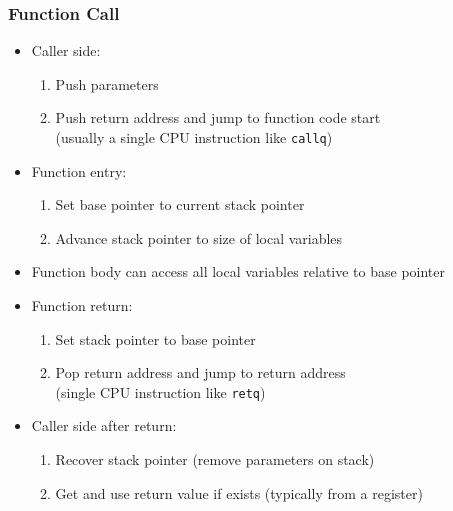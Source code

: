 \begin{frame}
\frametitle{Function Call}
\begin{itemize}
\item Caller side:
	\begin{enumerate}
	\item Push parameters
	\item Push return address and jump to function code start\\
		(usually a single CPU instruction like \lstinline!callq!)
	\end{enumerate}
\item Function entry:
	\begin{enumerate}
	\item Set base pointer to current stack pointer
	\item Advance stack pointer to size of local variables
	\end{enumerate}
\item Function body can access all local variables relative to base pointer\
\item Function return:
	\begin{enumerate}
	\item Set stack pointer to base pointer
	\item Pop return address and jump to return address\\
		(single CPU instruction like \lstinline!retq!)
	\end{enumerate}
\item Caller side after return:
	\begin{enumerate}
	\item Recover stack pointer (remove parameters on stack)
	\item Get and use return value if exists (typically from a register)
	\end{enumerate}
\end{itemize}
\end{frame}

